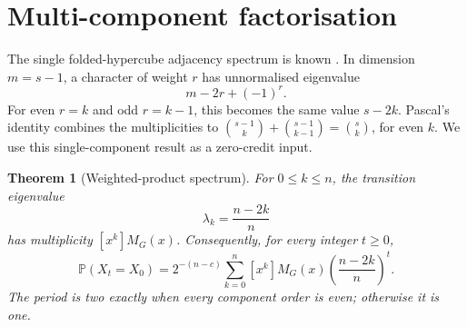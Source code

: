\documentclass[10pt,a4paper]{amsart}
\newtheorem{theorem}{Theorem}[section]
\theoremstyle{remark}
\newcommand{\Prob}{\mathbb P}
\begin{document}
\section{Multi-component factorisation}\label{sec:spectrum}

The single folded-hypercube adjacency spectrum is known
\citep[Theorem~2.3]{XuMeng2009Folded}.  In dimension $m=s-1$, a character of
weight $r$ has unnormalised eigenvalue
\begin{equation}\label{eq:owned-component-eigenvalue}
                    m-2r+(-1)^r.
\end{equation}
For even $r=k$ and odd $r=k-1$, this becomes the same value $s-2k$.
Pascal's identity combines the multiplicities to
$\binom{s-1}{k}+\binom{s-1}{k-1}=\binom{s}{k}$, for even $k$.  We use this
single-component result as a zero-credit input.

\begin{theorem}[Weighted-product spectrum]\label{thm:spectrum}
For $0\leq k\leq n$, the transition eigenvalue
\begin{equation}\label{eq:eigenvalue}
                         \lambda_k=\frac{n-2k}{n}
\end{equation}
has multiplicity $[x^k]M_G(x)$.  Consequently, for every integer $t\geq0$,
\begin{equation}\label{eq:return}
 \Prob(X_t=X_0)=2^{-(n-c)}\sum_{k=0}^n[x^k]M_G(x)
       \left(\frac{n-2k}{n}\right)^t.
\end{equation}
The period is two exactly when every component order is even; otherwise it is
one.
\end{theorem}
\end{document}
